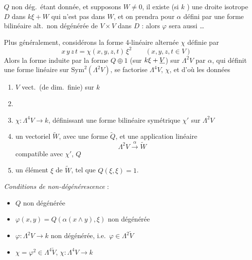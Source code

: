 \documentclass[11pt,a4paper]{article}
\begin{document}
 $Q$ non dég.\ étant donnée, et supposons
$W \neq 0$, il existe (si $k$ ) \struck{\ill{}} une droite
isotrope $D$ dans $k\xi + W$ qui n'est pas dans $W$, et on prendra pour $\alpha$
\struck{\ill{}} défini par une forme bilinéaire alt.\ non dégénérée \struck{\ill{}}
de $V \times V$ dans $D$ : alors $\varphi$ sera aussi \ldots

Plus généralement, considérons la forme 4-linéaire alternée $\chi$ définie par
\[
x\,y\,z\,t = \chi(x,y,z,t)\,\xi^{2} \qquad (x,y,z,t \in V)
\]
Alors la forme  induite par la forme $Q \oplus 1$ (sur
$k\xi + \uncertain{V}$) sur $\Lambda^{2}V$ par $\alpha$, qui définit une
 forme linéaire sur $\mathrm{Sym}^{2}(\Lambda^{2}V)$, se
factorise  $\Lambda^{4}V$,  $\chi$, et d'où
les données %

\begin{enumerate}
\item[a)] $V$ vect.\ (de dim.\ finie) sur $k$
\item[\struck{b)}] 
\item[b)] $\chi : \Lambda^{4}V \to k$, définissant une forme bilinéaire
      symétrique $\chi'$ sur $\Lambda^{2}V$
\item[c)] un vectoriel $\tilde W$, avec une forme 
       $\tilde Q$, et une application linéaire
      \[
      \Lambda^{2}V \xrightarrow{\ \alpha\ } \tilde W
      \]
      compatible avec $\chi'$, $Q$ 
\item[d)] un élément $\xi$ de $\tilde W$, tel que $Q(\xi,\xi) = 1$.
\end{enumerate}

\emph{Conditions de non-dégénérescence} :
\begin{itemize}
\item $Q$ non dégénérée
\item $\varphi(x,y) = Q(\alpha(x \wedge y), \xi)$ non dégénérée
\end{itemize}

\begin{itemize}
\item $\varphi : \Lambda^{2}V \to k$ non dégénérée, i.e.\ $\varphi \in \Lambda^{2}\check{V}$
\item {} \quad
      $\chi = \varphi^{2} \in \Lambda^{4}\check{V}$, \quad $\chi : \Lambda^{4}V \to k$
\end{itemize}
\end{document}
